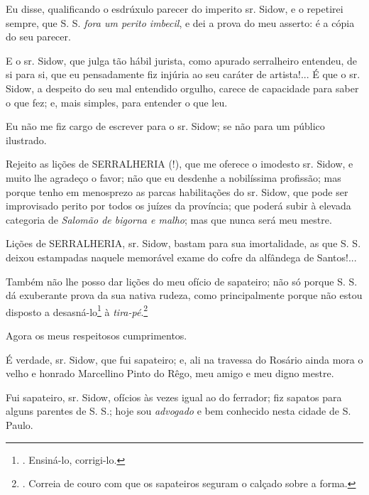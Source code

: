 Eu disse, qualificando o esdrúxulo parecer do imperito sr. Sidow, e o
repetirei sempre, que S. S. \emph{fora um perito imbecil}, e dei a prova
do meu asserto: é a cópia do seu parecer.

E o sr. Sidow, que julga tão hábil jurista, como apurado serralheiro
entendeu, de si para si, que eu pensadamente fiz injúria ao seu caráter
de artista!... É que o sr. Sidow, a despeito do seu mal entendido
orgulho, carece de capacidade para saber o que fez; e, mais simples,
para entender o que leu.

Eu não me fiz cargo de escrever para o sr. Sidow; se não para um público
ilustrado.

Rejeito as lições de SERRALHERIA (!), que me oferece o imodesto sr.
Sidow, e muito lhe agradeço o favor; não que eu desdenhe a nobilíssima
profissão; mas porque tenho em menosprezo as parcas habilitações do sr.
Sidow, que pode ser improvisado perito por todos os juízes da província;
que poderá subir à elevada categoria de \emph{Salomão de bigorna e
malho}; mas que nunca será meu mestre.

Lições de SERRALHERIA, sr. Sidow, bastam para sua imortalidade, as que
S. S. deixou estampadas naquele memorável exame do cofre da alfândega de
Santos!...

Também não lhe posso dar lições do meu ofício de sapateiro; não só
porque S. S. dá exuberante prova da sua nativa rudeza, como
principalmente porque não estou disposto a desasná-lo\footnote{.
  Ensiná-lo, corrigi-lo.} à \emph{tira-pé}.\footnote{. Correia de couro
  com que os sapateiros seguram o calçado sobre a forma.}

Agora os meus respeitosos cumprimentos.

É verdade, sr. Sidow, que fui sapateiro; e, ali na travessa do Rosário
ainda mora o velho e honrado Marcellino Pinto do Rêgo, meu amigo e meu
digno mestre.

Fui sapateiro, sr. Sidow, ofícios às vezes igual ao do ferrador; fiz
sapatos para alguns parentes de S. S.; hoje sou \emph{advogado} e bem
conhecido nesta cidade de S. Paulo.

